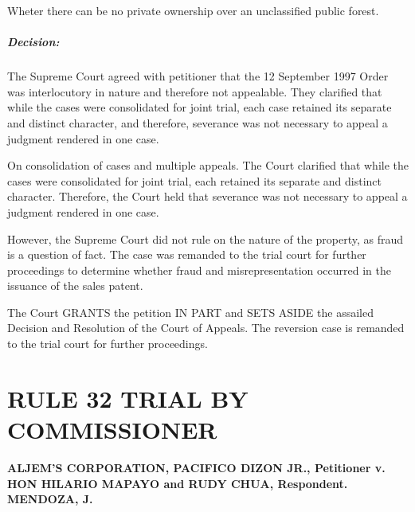 \documentclass[
12pt,
oneside,
onehalfspacing,
headsepline
]{DigestCollection}
\begin{document}
Wheter there can be no private ownership over an unclassified public forest.

\paragraph{Decision:}
\label{2ccc8590-1158-11ef-b8ef-a5537d38c9c8}


The Supreme Court agreed with petitioner that the 12 September 1997 Order was interlocutory in nature and therefore not appealable. They clarified that while the cases were consolidated for joint trial, each case retained its separate and distinct character, and therefore, severance was not necessary to appeal a judgment rendered in one case.

On consolidation of cases and multiple appeals. The Court clarified that while the cases were consolidated for joint trial, each retained its separate and distinct character. Therefore, the Court held that severance was not necessary to appeal a judgment rendered in one case.

However, the Supreme Court did not rule on the nature of the property, as fraud is a question of fact. The case was remanded to the trial court for further proceedings to determine whether fraud and misrepresentation occurred in the issuance of the sales patent.

The Court GRANTS the petition IN PART and SETS ASIDE the assailed Decision and Resolution of the Court of Appeals. The reversion case is remanded to the trial court for further proceedings. 

\chapter{RULE 32 TRIAL BY COMMISSIONER}
\label{8a735ff0-0a16-11ef-932c-63c852f65e48}


\label{b147b480-0a2c-11ef-a1a5-03b0bde1fccf}


\noindent\textbf{ALJEM’S CORPORATION, PACIFICO DIZON JR., Petitioner v. \\HON HILARIO MAPAYO and RUDY CHUA, Respondent. }\vspace{0.4cm}\noindent\textbf{MENDOZA, J.}\vspace{0.4cm}
\end{document}
